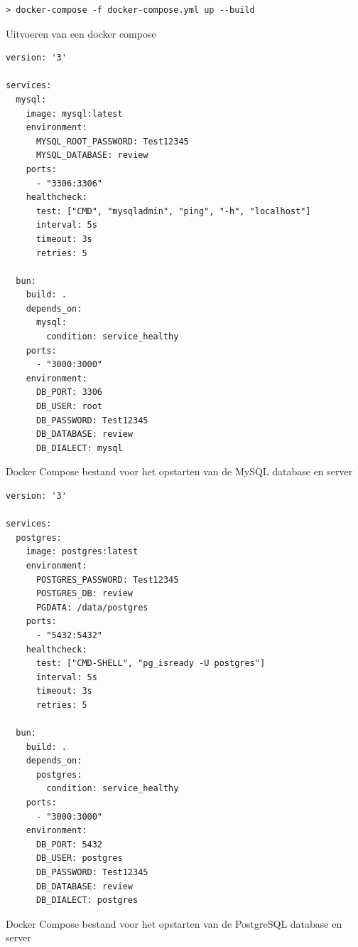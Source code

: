 \begin{listing}[H]
  \centering
  \begin{verbatim}
> docker-compose -f docker-compose.yml up --build
      \end{verbatim}
      \caption{\label{code:dockercompose}Uitvoeren van een docker compose}
\end{listing}
\begin{listing}[H]
  \centering
  \begin{verbatim}
version: '3'

services:
  mysql:
    image: mysql:latest
    environment:
      MYSQL_ROOT_PASSWORD: Test12345
      MYSQL_DATABASE: review
    ports:
      - "3306:3306"
    healthcheck:
      test: ["CMD", "mysqladmin", "ping", "-h", "localhost"]
      interval: 5s
      timeout: 3s
      retries: 5

  bun:
    build: .
    depends_on:
      mysql:
        condition: service_healthy
    ports:
      - "3000:3000"
    environment:
      DB_PORT: 3306
      DB_USER: root
      DB_PASSWORD: Test12345
      DB_DATABASE: review
      DB_DIALECT: mysql
      \end{verbatim}
      \caption{\label{code:dockercomposefile}Docker Compose bestand voor het opstarten van de MySQL database en server}
\end{listing}
\begin{listing}[H]
  \centering
  \begin{verbatim}
version: '3'

services:
  postgres:
    image: postgres:latest
    environment:
      POSTGRES_PASSWORD: Test12345
      POSTGRES_DB: review
      PGDATA: /data/postgres
    ports:
      - "5432:5432"
    healthcheck:
      test: ["CMD-SHELL", "pg_isready -U postgres"]
      interval: 5s
      timeout: 3s
      retries: 5

  bun:
    build: .
    depends_on:
      postgres:
        condition: service_healthy
    ports:
      - "3000:3000"
    environment:
      DB_PORT: 5432
      DB_USER: postgres
      DB_PASSWORD: Test12345
      DB_DATABASE: review
      DB_DIALECT: postgres
      \end{verbatim}
      \caption{\label{code:dockercomposepostgres}Docker Compose bestand voor het opstarten van de PostgreSQL database en server}
\end{listing}
